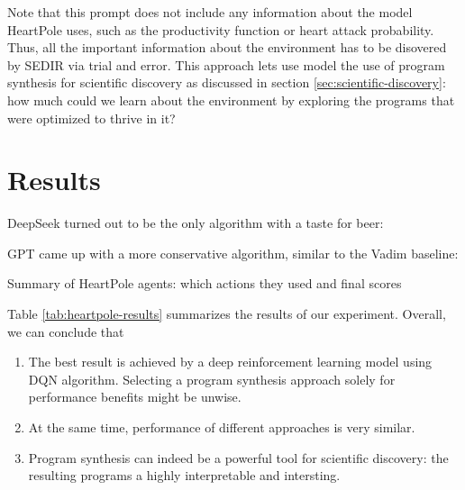 

Note that this prompt does not include any information about the model HeartPole uses, such as the productivity function or heart attack probability.
Thus, all the important information about the environment has to be disovered by SEDIR via trial and error.
This approach lets use model the use of program synthesis for scientific discovery as discussed in section \ref{sec:scientific-discovery}: how much could we learn about the environment by exploring the programs that were optimized to thrive in it?

\newpage
\section{Results}

DeepSeek turned out to be the only algorithm with a taste for beer:



GPT came up with a more conservative algorithm, similar to the Vadim baseline:



\begin{table}[]
    \centering
    
    \caption{Summary of HeartPole agents: which actions they used and final scores}
    \label{tab:heartpole-results}
\end{table}


Table \ref{tab:heartpole-results} summarizes the results of our experiment. Overall, we can conclude that

\begin{enumerate}
    \item The best result is achieved by a deep reinforcement learning model using DQN algorithm.
    Selecting a program synthesis approach solely for performance benefits might be unwise.
    \item At the same time, performance of different approaches is very similar.
    \item Program synthesis can indeed be a powerful tool for scientific discovery: the resulting programs a highly interpretable and intersting.
\end{enumerate}